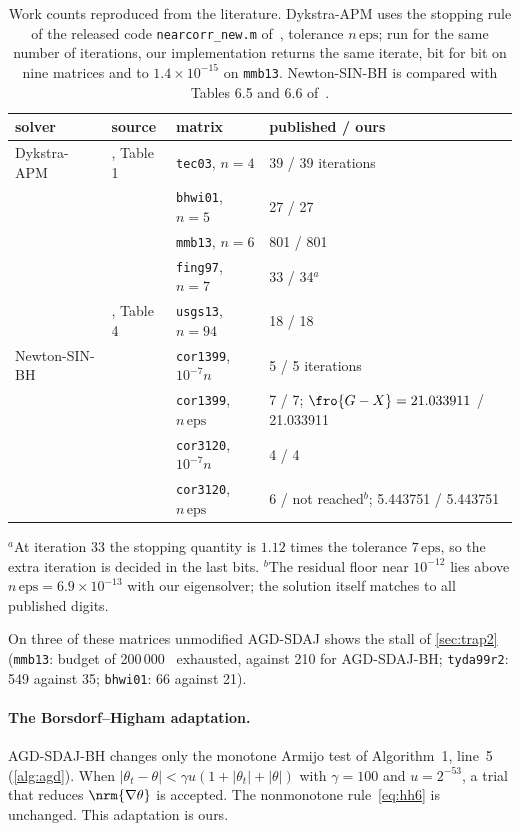 \begin{table}[h]
\centering
\caption{Work counts reproduced from the literature. Dykstra-APM uses the
stopping rule of the released code \texttt{nearcorr\_new.m}
of~\cite{higham2016anderson}, tolerance $n\,\mathrm{eps}$; run for the same
number of iterations, our implementation returns the same iterate, bit for
bit on nine matrices and to $1.4\times10^{-15}$ on \texttt{mmb13}. Newton-SIN-BH is compared with Tables 6.5 and 6.6
of~\cite{borsdorf2007newton}.}
\label{tab:external}
\small
\begin{tabular}{llll}
\toprule
solver & source & matrix & published / ours\\
\midrule
Dykstra-APM & \cite{higham2016anderson}, Table 1 & \texttt{tec03}, $n=4$ & 39 / 39 iterations\\
            & & \texttt{bhwi01}, $n=5$ & 27 / 27\\
            & & \texttt{mmb13}, $n=6$ & 801 / 801\\
            & & \texttt{fing97}, $n=7$ & 33 / 34$^{a}$\\
            & \cite{higham2016anderson}, Table 4 & \texttt{usgs13}, $n=94$ & 18 / 18\\
\midrule
Newton-SIN-BH & \cite{borsdorf2007newton} & \texttt{cor1399}, $10^{-7}n$ & 5 / 5 iterations\\
              & & \texttt{cor1399}, $n\,\mathrm{eps}$ & 7 / 7; $\fro{G-X}=21.033911$ / 21.033911\\
              & & \texttt{cor3120}, $10^{-7}n$ & 4 / 4\\
              & & \texttt{cor3120}, $n\,\mathrm{eps}$ & 6 / not reached$^{b}$; 5.443751 / 5.443751\\
\bottomrule
\end{tabular}
\end{table}
{\small $^{a}$At iteration 33 the stopping quantity is $1.12$ times the
tolerance $7\,\mathrm{eps}$, so the extra iteration is decided in the last
bits. $^{b}$The residual floor near $10^{-12}$ lies above
$n\,\mathrm{eps}=6.9\times10^{-13}$ with our eigensolver; the solution itself
matches to all published digits.\par}

On three of these matrices unmodified AGD-SDAJ shows the stall of
\cref{sec:trap2} (\texttt{mmb13}: budget of 200\,000 \EVDs\ exhausted, against
210 for AGD-SDAJ-BH; \texttt{tyda99r2}: 549 against 35; \texttt{bhwi01}: 66
against 21).

\paragraph{The Borsdorf--Higham adaptation.}
AGD-SDAJ-BH changes only the monotone Armijo test of Algorithm~1, line~5
(\cref{alg:agd}). When
$|\theta_t-\theta|<\gamma u(1+|\theta_t|+|\theta|)$ with $\gamma=100$ and
$u=2^{-53}$, a trial that reduces $\nrm{\nabla\theta}$ is accepted. The
nonmonotone rule~\eqref{eq:hh6} is unchanged. This adaptation is ours.
